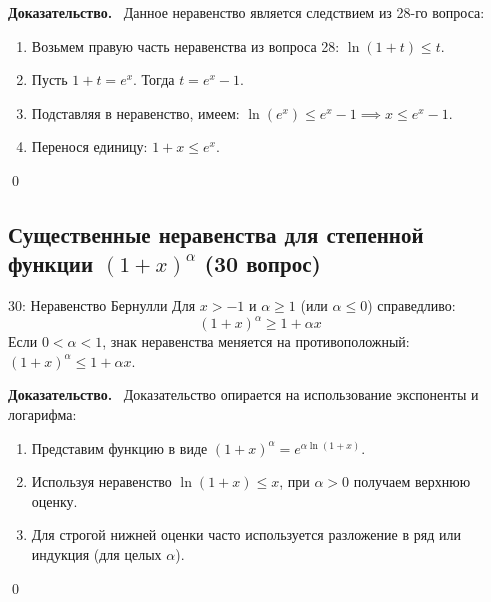 \documentclass[a4paper,12pt]{article}
\newcommand{\tsubsection}[2]{\subsection[#1]{\texorpdfstring{#2}{#1}}}
\newcommand{\myproof}{\textbf{Доказательство.}\ }
\begin{document}
	\vspace{0.5cm}
	\myproof
	Данное неравенство является следствием из 28-го вопроса:
	\begin{enumerate}
		\item Возьмем правую часть неравенства из вопроса 28: $\ln(1+t) \le t$.
		\item Пусть $1+t = e^x$. Тогда $t = e^x - 1$.
		\item Подставляя в неравенство, имеем: $\ln(e^x) \le e^x - 1 \implies x \le e^x - 1$.
		\item Перенося единицу: $1 + x \le e^x$.
	\end{enumerate} \qed
	
	\begin{center}
	\end{center}
	
	
	\newpage
	\tsubsection{Неравенство Бернулли (30 вопрос)}{Существенные неравенства для степенной функции $(1+x)^\alpha$ (30 вопрос)}
	
	\begin{theorembox}{30: Неравенство Бернулли}
		Для $x > -1$ и $\alpha \ge 1$ (или $\alpha \le 0$) справедливо:
		\[ (1+x)^\alpha \ge 1 + \alpha x \]
		Если $0 < \alpha < 1$, знак неравенства меняется на противоположный: $(1+x)^\alpha \le 1 + \alpha x$.
	\end{theorembox}
	
	\vspace{0.5cm}
	\myproof
	Доказательство опирается на использование экспоненты и логарифма:
	\begin{enumerate}
		\item Представим функцию в виде $(1+x)^\alpha = e^{\alpha \ln(1+x)}$.
		\item Используя неравенство $\ln(1+x) \le x$, при $\alpha > 0$ получаем верхнюю оценку.
		\item Для строгой нижней оценки часто используется разложение в ряд или индукция (для целых $\alpha$).
	\end{enumerate} \qed
	
\end{document}
